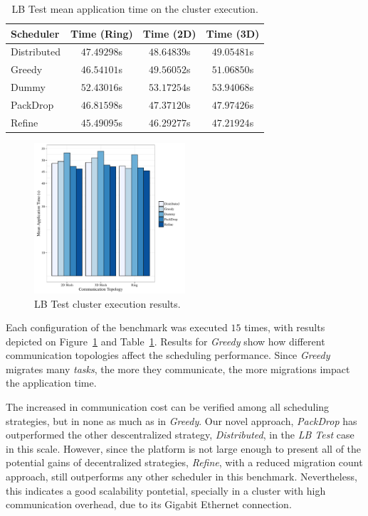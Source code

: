 \begin{table}[t]
	\centering
    \caption{LB Test mean application time on the cluster execution.}
	\begin{tabular}{l | c  c  c}
    	Scheduler & Time (Ring) & Time (2D) & Time (3D) \\ \hline
        Distributed & $47.49298$s & $48.64839$s & $49.05481$s \\
        Greedy & $46.54101$s & $49.56052$s & $51.06850$s \\
        Dummy & $52.43016$s & $53.17254$s & $53.94068$s \\
        PackDrop & $46.81598$s & $47.37120$s & $47.97426$s \\
        Refine & $45.49095$s & $46.29277$s & $47.21924$s \\		
	\end{tabular}
    \label{tab:lbtest:apptime}
\end{table}

\begin{figure}
	\centering
    \hspace{-10pt}\includegraphics[width=0.5\textwidth]{images/apptime_lbtest_g5k.pdf}
    \caption{LB Test cluster execution results.}
    \label{fig:eval:g5k:lbtest:apptime}
\end{figure}


Each configuration of the benchmark was executed $15$ times, with results depicted on Figure~\ref{fig:eval:g5k:lbtest:apptime} and Table~\ref{tab:lbtest:apptime}.
Results for \textit{Greedy} show how different communication topologies affect the scheduling performance.
Since \textit{Greedy} migrates many \textit{tasks}, the more they communicate, the more migrations impact the application time.

The increased in communication cost can be verified among all scheduling strategies, but in none as much as in \textit{Greedy}.
Our novel approach, \textit{PackDrop} has outperformed the other descentralized strategy, \textit{Distributed}, in the \textit{LB Test} case in this scale.
However, since the platform is not large enough to present all of the potential gains of decentralized strategies, \textit{Refine}, with a reduced migration count approach, still outperforms any other scheduler in this benchmark.
Nevertheless, this indicates a good scalability pontetial, specially in a cluster with high communication overhead, due to its Gigabit Ethernet connection.

